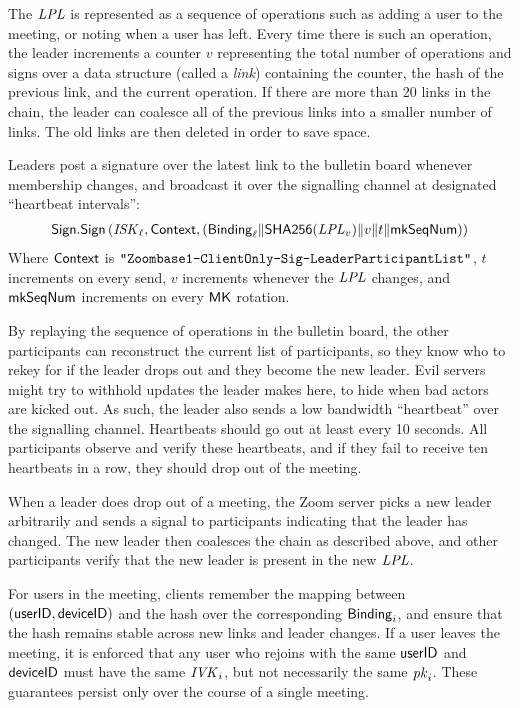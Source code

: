 The $\mathit{LPL}$ is represented as a sequence of operations such as adding a user to the meeting, or noting when a user has left. Every time there is such an operation, the leader increments a counter $v$ representing the total number of operations and signs over a data structure (called a \textit{link}) containing the counter, the hash of the previous link, and the current operation. If there are more than 20 links in the chain, the leader can coalesce all of the previous links into a smaller number of links. The old links are then deleted in order to save space.

Leaders post a signature over the latest link to the bulletin board whenever membership changes, and broadcast it over the signalling channel at designated ``heartbeat intervals'':
%
\begin{align*}
{\sf Sign}.\mathsf{Sign} \left(\mathit{ISK}_{\ell}, {\sf Context}, ({\sf Binding}_{\ell} \| \mathsf{SHA256}(\mathit{LPL}_v) \| v \| t \| \mathsf{mkSeqNum} ) \right)
\end{align*}
%
Where ${\sf Context}$ is $\texttt{"Zoombase1-ClientOnly-Sig-Leader\-Participant\-List"}$, $t$ increments on every send, $v$ increments whenever the $\mathit{LPL}$ changes, and $\mathsf{mkSeqNum}$ increments on every ${\sf MK}$ rotation.

By replaying the sequence of operations in the bulletin board, the other participants can reconstruct the current list of participants, so they know who to rekey for if the leader drops out and they become the new leader. Evil servers might try to withhold updates the leader makes here, to hide when bad actors are kicked out. As such, the leader also sends a low bandwidth ``heartbeat'' over the signalling channel. Heartbeats should go out at least every 10 seconds. All participants observe and verify these heartbeats, and if they fail to receive ten heartbeats in a row, they should drop out of the meeting.

When a leader does drop out of a meeting, the Zoom server picks a new leader arbitrarily and sends a signal to participants indicating that the leader has changed. The new leader then coalesces the chain as described above, and other participants verify that the new leader is present in the new $\mathit{LPL}$.

For users in the meeting, clients remember the mapping between $(\mathsf{userID}, {\sf deviceID})$ and the hash over the corresponding ${\sf Binding}_i$, and ensure that the hash remains stable across new links and leader changes. If a user leaves the meeting, it is enforced that any user who rejoins with the same $\mathsf{userID}$ and ${\sf deviceID}$ must have the same $\mathit{IVK}_i$, but not necessarily the same $\mathit{pk}_i$. These guarantees persist only over the course of a single meeting.

